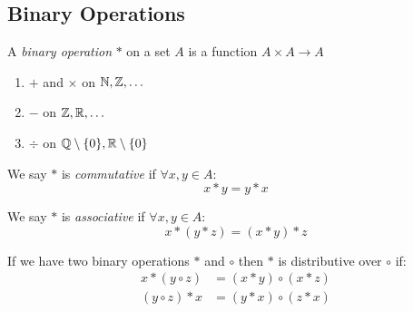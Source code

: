 \documentclass[../main.tex]{subfiles}
\begin{document}
\subsection{Binary Operations}
\begin{definition}
  A \textit{binary operation} $*$ on a set $A$ is a function $A \times A \to A$
\end{definition}
\begin{example}
  \begin{enumerate}
    \item $+$ and $\times$ on $\mathbb{N}, \mathbb{Z}, \ldots$
    \item $-$ on $\mathbb{Z}, \mathbb{R}, \ldots$
    \item $\div$ on $\mathbb{Q} \setminus \{0\}, \mathbb{R} \setminus \{0\}$
  \end{enumerate}
\end{example}
\begin{definition}[Commutative]
  We say $*$ is \textit{commutative} if $\forall x, y \in A$:
  \[
    x * y = y * x
  \]
\end{definition}
\begin{definition}[Associative]
  We say $*$ is \textit{associative} if $\forall x, y \in A$:
  \[
    x * (y * z) = (x * y) * z
  \]
\end{definition}
\begin{definition}[Distributive]
  If we have two binary operations $*$ and $\circ$ then $*$ is distributive over $\circ$ if:
  \begin{align*}
    x * (y \circ z) &= (x * y) \circ (x * z) \\
    (y \circ z) * x &= (y * x) \circ (z * x)
  \end{align*}
\end{definition}
\end{document}
